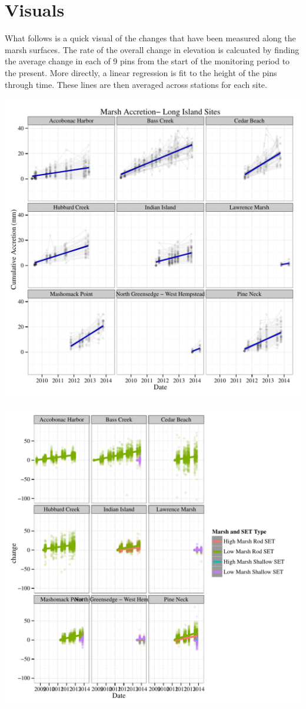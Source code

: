 \documentclass{article}\usepackage[]{graphicx}\usepackage[]{color}
\makeatletter
\def\maxwidth{ %
  \ifdim\Gin@nat@width>\linewidth
    \linewidth
  \else
    \Gin@nat@width
  \fi
}
\makeatother
\begin{document}
\section{Visuals}
What follows is a quick visual of the changes that have been measured along the marsh surfaces. The rate of the overall change in elevation is calcuated by finding the average change in each of 9 pins from the start of the monitoring period to the present. More directly, a linear regression is fit to the height of the pins through time. These lines are then averaged across stations for each site. 



{\centering \includegraphics[width=\maxwidth]{figure/SA_Plots} 

}







{\centering \includegraphics[width=\maxwidth]{figure/Plot_multiLMs} 

}
\end{document}
